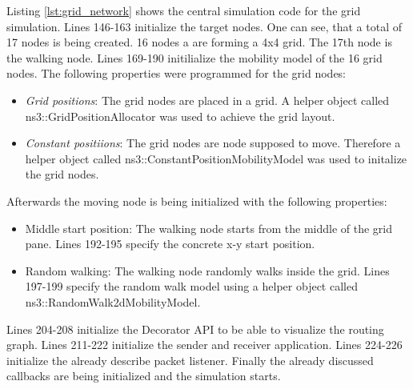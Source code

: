 Listing \ref{lst:grid_network} shows the central simulation code
for the grid simulation. Lines 146-163 initialize the target nodes.
One can see, that a total of 17 nodes is being created. 16 nodes a
are forming a 4x4 grid. The 17th node is the walking node. Lines 169-190
initilialize the mobility model of the 16 grid nodes. The following
properties were programmed for the grid nodes:
\begin{itemize}
\item \textit{Grid positions}: The grid nodes are placed in a grid. A helper
object called ns3::GridPositionAllocator was used to achieve the grid
layout.
\item \textit{Constant positiions}: The grid nodes are node supposed to
move. Therefore a helper object called ns3::ConstantPositionMobilityModel
was used to initalize the grid nodes.
\end{itemize}
Afterwards the moving node is being initialized with the following
properties:
\begin{itemize}
\item Middle start position: The walking node starts from the middle of
the grid pane. Lines 192-195 specify the concrete x-y start position.
\item Random walking: The walking node randomly walks inside the grid. Lines
197-199 specify the random walk model using a helper object called
ns3::RandomWalk2dMobilityModel.
\end{itemize}
Lines 204-208 initialize the Decorator API to be able to visualize
the routing graph. Lines 211-222 initialize the sender and receiver
application. Lines 224-226 initialize the already describe packet
listener. Finally the already discussed callbacks are being initialized
and the simulation starts.

\texttt{\small }{\small \par}


